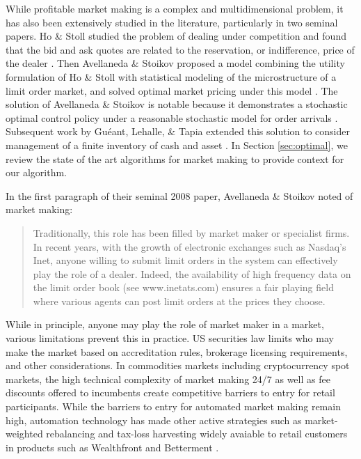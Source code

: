 \documentclass{article}
\begin{document}
While profitable market making is a complex and multidimensional problem, it has also been extensively studied in the literature, particularly in two seminal papers. Ho \& Stoll studied the problem of dealing under competition and found that the bid and ask quotes are related to the reservation, or indifference, price of the dealer \cite{ho1980on}. Then Avellaneda \& Stoikov proposed a model combining the utility formulation of Ho \& Stoll with statistical modeling of the microstructure of a limit order market, and solved optimal market pricing under this model \cite{avellaneda2008high}. The solution of Avellaneda \& Stoikov is notable because it demonstrates a stochastic optimal control policy under a reasonable stochastic model for order arrivals \cite{bouchard2002statistical}. Subsequent work by Guéant, Lehalle, \& Tapia extended this solution to consider management of a finite inventory of cash and asset \cite{guéant2012dealing}. In Section \ref{sec:optimal}, we review the state of the art algorithms for market making to provide context for our algorithm.

In the first paragraph of their seminal 2008 paper, Avellaneda \& Stoikov noted of market making:

\begin{quote}
Traditionally, this role has been filled by market maker or specialist firms. In recent years, with the growth of electronic exchanges such as Nasdaq’s Inet, anyone willing to submit limit orders in the system can effectively play the role of a dealer. Indeed, the availability of high frequency data on the limit order book (see www.inetats.com) ensures a fair playing field where various agents can post limit orders at the prices they choose.
\end{quote}

While in principle, anyone may play the role of market maker in a market, various limitations prevent this in practice. US securities law limits who may make the market based on accreditation rules, brokerage licensing requirements, and other considerations. In commodities markets including cryptocurrency spot markets, the high technical complexity of market making 24/7 as well as fee discounts offered to incumbents create competitive barriers to entry for retail participants. While the barriers to entry for automated market making remain high, automation technology has made other active strategies such as market-weighted rebalancing and tax-loss harvesting widely avaiable to retail customers in products such as Wealthfront and Betterment \cite{wealthfront, betterment}.
\end{document}
